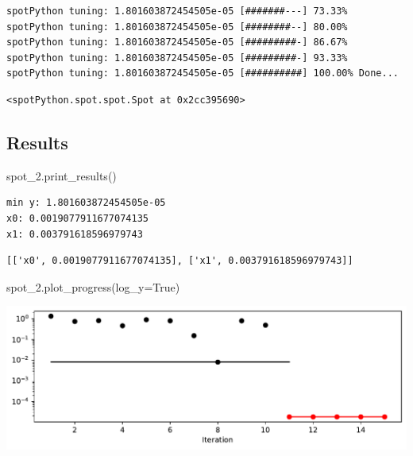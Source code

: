 \documentclass[
  letterpaper,
  DIV=11,
  numbers=noendperiod]{scrreprt}
\newenvironment{Shaded}{\begin{snugshade}}{\end{snugshade}}
\newcommand{\NormalTok}[1]{\textcolor[rgb]{0.00,0.23,0.31}{#1}}
\newcommand{\OperatorTok}[1]{\textcolor[rgb]{0.37,0.37,0.37}{#1}}
\newcommand{\VariableTok}[1]{\textcolor[rgb]{0.07,0.07,0.07}{#1}}
\begin{document}
\begin{verbatim}
spotPython tuning: 1.801603872454505e-05 [#######---] 73.33% 
spotPython tuning: 1.801603872454505e-05 [########--] 80.00% 
spotPython tuning: 1.801603872454505e-05 [#########-] 86.67% 
spotPython tuning: 1.801603872454505e-05 [#########-] 93.33% 
spotPython tuning: 1.801603872454505e-05 [##########] 100.00% Done...
\end{verbatim}

\begin{verbatim}
<spotPython.spot.spot.Spot at 0x2cc395690>
\end{verbatim}

\subsection{Results}\label{results-2}

\begin{Shaded}
\begin{Highlighting}[]
\NormalTok{spot\_2.print\_results()}
\end{Highlighting}
\end{Shaded}

\begin{verbatim}
min y: 1.801603872454505e-05
x0: 0.0019077911677074135
x1: 0.003791618596979743
\end{verbatim}

\begin{verbatim}
[['x0', 0.0019077911677074135], ['x1', 0.003791618596979743]]
\end{verbatim}

\begin{Shaded}
\begin{Highlighting}[]
\NormalTok{spot\_2.plot\_progress(log\_y}\OperatorTok{=}\VariableTok{True}\NormalTok{)}
\end{Highlighting}
\end{Shaded}

\includegraphics{009_num_spot_anisotropic_files/figure-pdf/cell-7-output-1.pdf}
\end{document}
